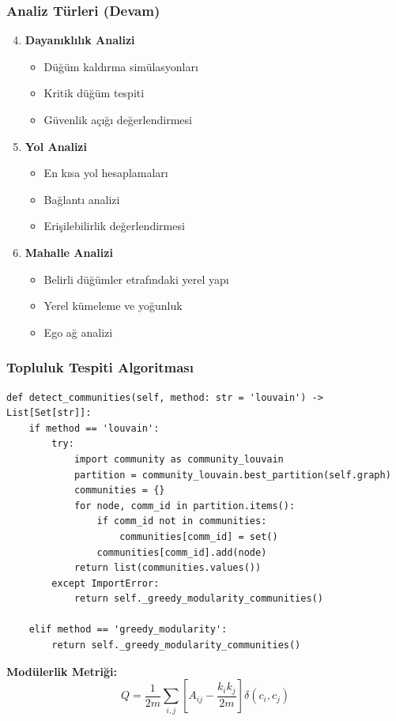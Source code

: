 \documentclass[aspectratio=169]{beamer}
\begin{document}
\begin{frame}
\frametitle{Analiz Türleri (Devam)}
\begin{enumerate}
\setcounter{enumi}{3}
    \item \textbf{Dayanıklılık Analizi}
    \begin{itemize}
        \item Düğüm kaldırma simülasyonları
        \item Kritik düğüm tespiti
        \item Güvenlik açığı değerlendirmesi
    \end{itemize}
    
    \item \textbf{Yol Analizi}
    \begin{itemize}
        \item En kısa yol hesaplamaları
        \item Bağlantı analizi
        \item Erişilebilirlik değerlendirmesi
    \end{itemize}
    
    \item \textbf{Mahalle Analizi}
    \begin{itemize}
        \item Belirli düğümler etrafındaki yerel yapı
        \item Yerel kümeleme ve yoğunluk
        \item Ego ağ analizi
    \end{itemize}
\end{enumerate}
\end{frame}

\begin{frame}[fragile]
\frametitle{Topluluk Tespiti Algoritması}
\begin{lstlisting}[caption=Louvain Algoritması Implementasyonu]
def detect_communities(self, method: str = 'louvain') -> List[Set[str]]:
    if method == 'louvain':
        try:
            import community as community_louvain
            partition = community_louvain.best_partition(self.graph)
            communities = {}
            for node, comm_id in partition.items():
                if comm_id not in communities:
                    communities[comm_id] = set()
                communities[comm_id].add(node)
            return list(communities.values())
        except ImportError:
            return self._greedy_modularity_communities()
    
    elif method == 'greedy_modularity':
        return self._greedy_modularity_communities()
\end{lstlisting}

\textbf{Modülerlik Metriği:}
$$Q = \frac{1}{2m} \sum_{i,j} \left[ A_{ij} - \frac{k_i k_j}{2m} \right] \delta(c_i, c_j)$$
\end{frame}
\end{document}
